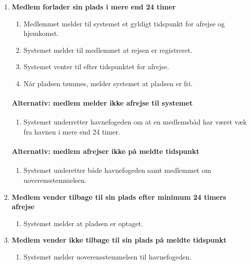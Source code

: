   \begin{enumerate}

    \item{\bf{Medlem forlader sin plads i mere end 24 timer}}
      \begin{enumerate}
        \item Medlemmet melder til systemet et gyldigt tidspunkt for afrejse og hjemkomst.
        \item Systemet melder til medlemmet at rejsen er registreret.
        \item Systemet venter til efter tidspunktet for afrejse.
        \item Når pladsen tømmes, melder systemet at pladsen er fri.
      \end{enumerate}

    \paragraph{Alternativ: medlem melder ikke afrejse til systemet}
      \begin{enumerate}
        \item Systemet underretter havnefogeden om at en medlemsbåd har været væk fra havnen i mere end 24 timer.
      \end{enumerate}

    \paragraph{Alternativ: medlem afrejser ikke på meldte tidspunkt}
      \begin{enumerate}
        \item Systemet underetter både havnefogeden samt medlemmet om uoverensstemmelsen.
      \end{enumerate}


    \item{\bf{Medlem vender tilbage til sin plads efter minimum 24 timers afrejse}}
      \begin{enumerate}
        \item Systemet melder at pladsen er optaget.
      \end{enumerate}


    \item{\bf{Medlem vender ikke tilbage til sin plads på meldte tidspunkt}}
      \begin{enumerate}
        \item Systemet melder uoverensstemmelsen til havnefogeden.
      \end{enumerate}



\end{enumerate}
